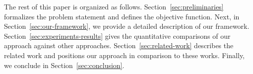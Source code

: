 The rest of this paper is organized as follows.
Section~\ref{sec:preliminaries} formalizes the problem statement and
defines the objective function. Next, in
Section~\ref{sec:our-framework}, we provide a detailed description of
our framework. %
Section~\ref{sec:experiments-results} gives the quantitative
comparisons of our approach against other
approaches. Section~\ref{sec:related-work} describes the related work
and positions our approach in comparison to these works.  Finally, we
conclude in Section~\ref{sec:conclusion}.



